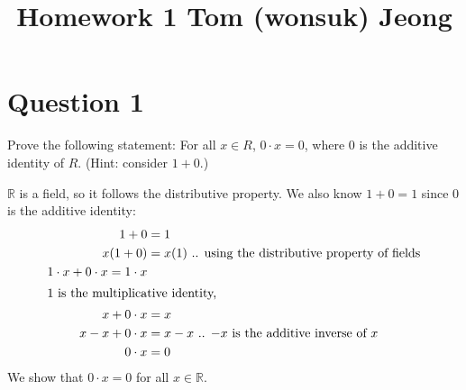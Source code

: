 \documentclass{article}
\begin{document}

\title{Homework 1 Tom (wonsuk) Jeong  }
\maketitle
\section{Question 1} Prove the following statement:  For all $x \in R$, $0 \cdot x = 0$, where $0$ is the additive identity of $R$. (Hint: consider $1 + 0$.)
\begin{proofbox}
    $\mathbb{R}$ is a field, so it follows the distributive property. We also know $1 + 0 = 1$ since 0 is the additive identity: 
    \begin{align*}
        1 + 0 &= 1 \\ 
        x(1 + 0) &= x(1) \text{ .. using the distributive property of fields} \\ 
        1 \cdot x + 0 \cdot x = 1 \cdot x \\
        \intertext{1 is the multiplicative identity,} 
        x + 0 \cdot x &= x \\ 
        x - x + 0\cdot x &= x - x \text{ .. $-x$ is the additive inverse of $x$ } \\ 
        0 \cdot x &= 0 \\
    \end{align*}
    We show that $0 \cdot x = 0$ for all $x \in \mathbb{R}$.
\end{proofbox}
\end{document}
